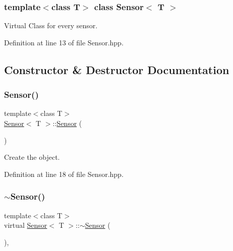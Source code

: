 \subsubsection*{template$<$class T$>$\newline
class Sensor$<$ T $>$}

Virtual Class for every sensor. 

Definition at line 13 of file Sensor.\+hpp.



\subsection{Constructor \& Destructor Documentation}
\mbox{\label{class_sensor_aec4ccadfbcd62394d8eb7c067079c533}} 
\subsubsection{\texorpdfstring{Sensor()}{Sensor()}}
{\footnotesize\ttfamily template$<$class T$>$ \\
\hyperlink{class_sensor}{Sensor}$<$ T $>$\+::\hyperlink{class_sensor}{Sensor} (\begin{DoxyParamCaption}{ }\end{DoxyParamCaption})\hspace{0.3cm}{\ttfamily [inline]}}



Create the object. 



Definition at line 18 of file Sensor.\+hpp.

\mbox{\label{class_sensor_a33f614626c02a1c7bc9529fd7b7b9888}} 
\subsubsection{\texorpdfstring{$\sim$\+Sensor()}{~Sensor()}}
{\footnotesize\ttfamily template$<$class T$>$ \\
virtual \hyperlink{class_sensor}{Sensor}$<$ T $>$\+::$\sim$\hyperlink{class_sensor}{Sensor} (\begin{DoxyParamCaption}{ }\end{DoxyParamCaption})\hspace{0.3cm}{\ttfamily [inline]}, {\ttfamily [virtual]}}



